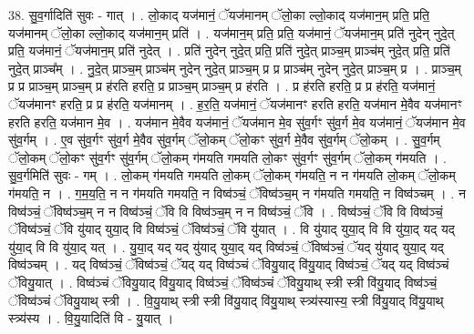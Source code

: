 \documentclass[17pt]{extarticle}
\begin{document}
38. सु॒व॒र्गादिति॑ सुवः - गात् । . लो॒काद् यज॑मानं॒ ॅयज॑मानम् ॅलो॒का ल्लो॒काद् यज॑मान॒म् प्रति॒ प्रति॒ यज॑मानम् ॅलो॒का ल्लो॒काद् यज॑मान॒म् प्रति॑ । . यज॑मान॒म् प्रति॒ प्रति॒ यज॑मानं॒ ॅयज॑मान॒म् प्रति॑ नुदेन् नुदे॒त् प्रति॒ यज॑मानं॒ ॅयज॑मान॒म् प्रति॑ नुदेत् । . प्रति॑ नुदेन् नुदे॒त् प्रति॒ प्रति॑ नुदे॒त् प्राञ्च॒म् प्राञ्च॑म् नुदे॒त् प्रति॒ प्रति॑ नुदे॒त् प्राञ्च᳚म् । . नु॒दे॒त् प्राञ्च॒म् प्राञ्च॑म् नुदेन् नुदे॒त् प्राञ्च॒म् प्र प्र प्राञ्च॑म् नुदेन् नुदे॒त् प्राञ्च॒म् प्र । . प्राञ्च॒म् प्र प्र प्राञ्च॒म् प्राञ्च॒म् प्र ह॑रति हरति॒ प्र प्राञ्च॒म् प्राञ्च॒म् प्र ह॑रति । . प्र ह॑रति हरति॒ प्र प्र ह॑रति॒ यज॑मानं॒ ॅयज॑मानꣳ हरति॒ प्र प्र ह॑रति॒ यज॑मानम् । . ह॒र॒ति॒ यज॑मानं॒ ॅयज॑मानꣳ हरति हरति॒ यज॑मान मे॒वैव यज॑मानꣳ हरति हरति॒ यज॑मान मे॒व । . यज॑मान मे॒वैव यज॑मानं॒ ॅयज॑मान मे॒व सु॑व॒र्गꣳ सु॑व॒र्ग मे॒व यज॑मानं॒ ॅयज॑मान मे॒व सु॑व॒र्गम् । . ए॒व सु॑व॒र्गꣳ सु॑व॒र्ग मे॒वैव सु॑व॒र्गम् ॅलो॒कम् ॅलो॒कꣳ सु॑व॒र्ग मे॒वैव सु॑व॒र्गम् ॅलो॒कम् । . सु॒व॒र्गम् ॅलो॒कम् ॅलो॒कꣳ सु॑व॒र्गꣳ सु॑व॒र्गम् ॅलो॒कम् ग॑मयति गमयति लो॒कꣳ सु॑व॒र्गꣳ सु॑व॒र्गम् ॅलो॒कम् ग॑मयति । . सु॒व॒र्गमिति॑ सुवः - गम् । . लो॒कम् ग॑मयति गमयति लो॒कम् ॅलो॒कम् ग॑मयति॒ न न ग॑मयति लो॒कम् ॅलो॒कम् ग॑मयति॒ न । . ग॒म॒य॒ति॒ न न ग॑मयति गमयति॒ न विष्व॑ञ्चं॒ ॅविष्व॑ञ्च॒म् न ग॑मयति गमयति॒ न विष्व॑ञ्चम् । . न विष्व॑ञ्चं॒ ॅविष्व॑ञ्च॒म् न न विष्व॑ञ्चं॒ ॅवि वि विष्व॑ञ्च॒म् न न विष्व॑ञ्चं॒ ॅवि । . विष्व॑ञ्चं॒ ॅवि वि विष्व॑ञ्चं॒ ॅविष्व॑ञ्चं॒ ॅवि यु॑याद् युया॒द् वि विष्व॑ञ्चं॒ ॅविष्व॑ञ्चं॒ ॅवि यु॑यात् । . वि यु॑याद् युया॒द् वि वि यु॑या॒द् यद् यद् यु॑या॒द् वि वि यु॑या॒द् यत् । . यु॒या॒द् यद् यद् यु॑याद् युया॒द् यद् विष्व॑ञ्चं॒ ॅविष्व॑ञ्चं॒ ॅयद् यु॑याद् युया॒द् यद् विष्व॑ञ्चम् । . यद् विष्व॑ञ्चं॒ ॅविष्व॑ञ्चं॒ ॅयद् यद् विष्व॑ञ्चं ॅवियु॒याद् वि॑यु॒याद् विष्व॑ञ्चं॒ ॅयद् यद् विष्व॑ञ्चं ॅवियु॒यात् । . विष्व॑ञ्चं ॅवियु॒याद् वि॑यु॒याद् विष्व॑ञ्चं॒ ॅविष्व॑ञ्चं ॅवियु॒याथ् स्त्री स्त्री वि॑यु॒याद् विष्व॑ञ्चं॒ ॅविष्व॑ञ्चं ॅवियु॒याथ् स्त्री । . वि॒यु॒याथ् स्त्री स्त्री वि॑यु॒याद् वि॑यु॒याथ् स्त्र्य॑स्यास्य॒ स्त्री वि॑यु॒याद् वि॑यु॒याथ् स्त्र्य॑स्य । . वि॒यु॒यादिति॑ वि - यु॒यात् । \newline
\pagebreak
{}
\end{document}
